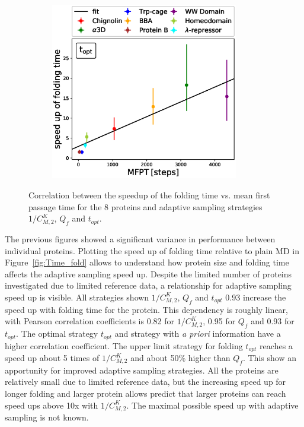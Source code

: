 \begin{figure}[H]
\begin{subfigure}[t]{0.5\textwidth}
    \includegraphics[width=0.9\textwidth]{figures/compare_MD_speed_up_t_opt_6_steps10000_52_0.eps}
  \end{subfigure}
  \caption{Correlation between the speedup of the folding time vs. mean first passage time for the 8 proteins and adaptive sampling strategies $1/C_{M,2}^K$, $Q_f$ and $t_{opt}$.}
  \label{fig:compare-MD-speed-cmacro}
\end{figure}

The previous figures showed a significant variance in performance between individual proteins. Plotting the speed up of folding time relative to plain MD in Figure~\ref{fig:Time_fold} allows to understand how protein size and folding time affects the adaptive sampling speed up. Despite the limited number of proteins investigated due to limited reference data, a relationship for adaptive sampling speed up is visible. All strategies shown $1/C_{M,2}^K$, $Q_f$ and $t_{opt}$ 0.93 increase the speed up with folding time for the protein. This dependency is roughly linear, with Pearson correlation coefficients is 0.82 for $1/C_{M,2}^K$, 0.95 for $Q_f$ and 0.93 for $t_{opt}$. The optimal strategy $t_{opt}$ and strategy with \emph{a priori} information have a higher correlation coefficient. The upper limit strategy for folding $t_{opt}$ reaches a speed up about 5 times of $1/C_{M,2}^K$ and about 50\% higher than $Q_f$. This show an apportunity for improved adaptive sampling strategies. All the proteins are relatively small due to limited reference data, but the increasing speed up for longer folding and larger protein allows predict that larger proteins can reach speed ups above 10x with $1/C_{M,2}^K$. The maximal possible speed up with adaptive sampling is not known. 

